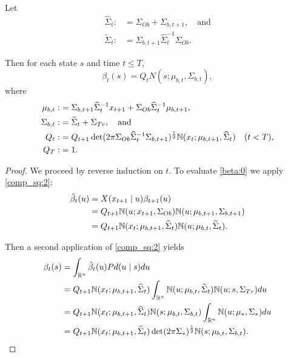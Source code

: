 \documentclass[12pt,leqno]{article}
\begin{document}
\begin{Thm}\label{beta:1}
  Let 
\begin{align*}
  \widehat{\Sigma}_t :&= \Sigma_{Ob}+\Sigma_{b,t+1},\quad\text{and}\\
    \widetilde{\Sigma}_t :&= \Sigma_{b,t+1}\widehat{\Sigma}_t^{-1}\Sigma_{Ob}.
\end{align*}

  Then for each state $s$ and time $t \le T$,
$$
  \beta_t(s) = Q_tN(s;\mu_{b,t},\Sigma_{b,t}),
$$
where
\begin{align*}
  \mu_{b,t} :&= \Sigma_{b,t+1}\widehat{\Sigma}_t^{-1}x_{t+1} + \Sigma_{Ob}\widehat{\Sigma}_t^{-1}\mu_{b,t+1},\\
  \Sigma_{b,t} :&= \widetilde{\Sigma}_t + \Sigma_{Tr},\quad\text{and}\\
  Q_t:&=Q_{t+1}\det(2\pi\Sigma_{Ob}\widehat{\Sigma}_t^{-1}\Sigma_{b,t+1})^{\frac{1}{2}}{\mathbb N}(x_t;\mu_{b,t+1},\widehat{\Sigma}_t)
\quad(t< T),\\
  Q_T :&= 1.
\end{align*}
\end{Thm}

\begin{proof}
  We proceed by reverse induction on $t$.  To evaluate \eqref{beta:0} we apply \eqref{comp_sq:2}:
  \begin{align*}
    \hat{\beta}_t(u) &= X(x_{t+1}\mid u)\beta_{t+1}(u)\\
    &= Q_{t+1}{\mathbb N}(u;x_{t+1},\Sigma_{Ob}){\mathbb N}(u;\mu_{b,t+1},\Sigma_{b,t+1})\\
    &= Q_{t+1}{\mathbb N}(x_t;\mu_{b,t+1},\widehat{\Sigma}_t){\mathbb N}(u;\mu_{b,t},\widetilde{\Sigma}_t).
  \end{align*}

  Then a second application of \eqref{comp_sq:2} yields
  \begin{align*}
    \beta_t(s) &= \int_{{\mathbb R}^n}\hat{\beta}_t(u)Pd(u\mid s)du \\
    &= Q_{t+1}{\mathbb N}(x_t;\mu_{b,t+1},\widehat{\Sigma}_t)\int_{{\mathbb R}^n}{\mathbb N}(u;\mu_{b,t},\widetilde{\Sigma}_t){\mathbb N}(u;s,\Sigma_{Tr})du\\
    &=Q_{t+1}{\mathbb N}(x_t;\mu_{b,t+1},\widehat{\Sigma}_t){\mathbb N}(s;\mu_{b,t},\Sigma_{b,t})\int_{{\mathbb R}^n}{\mathbb N}(u;\mu_*,\Sigma_*)du \\
    &= Q_{t+1}{\mathbb N}(x_t;\mu_{b,t+1},\widehat{\Sigma}_t)\det(2\pi\Sigma_*)^{\frac{1}{2}}
    {\mathbb N}(s;\mu_{b,t},\Sigma_{b,t}).
  \end{align*}
\end{proof}
\end{document}
